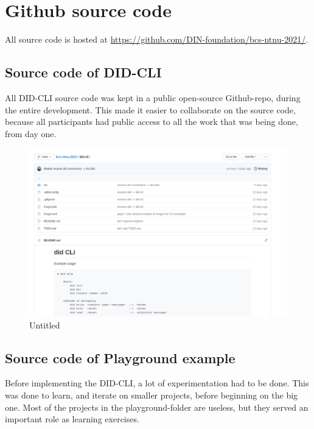 \pagebreak

\hypertarget{github-source-code}{%
\section{Github source code}\label{github-source-code}}

All source code is hosted at
\url{https://github.com/DIN-foundation/bcs-ntnu-2021/}.

\hypertarget{source-code-of-did-cli}{%
\subsection{Source code of DID-CLI}\label{source-code-of-did-cli}}

All DID-CLI source code was kept in a public open-source Github-repo,
during the entire development. This made it easier to collaborate on the
source code, because all participants had public access to all the work
that was being done, from day one.

\begin{figure}
\centering
\includegraphics{Development Process a132dd5987b94adf8fc5989add9afc3f/Untitled 1.png}
\caption{Untitled}
\end{figure}

\hypertarget{source-code-of-playground-example}{%
\subsection{Source code of Playground
example}\label{source-code-of-playground-example}}

Before implementing the DID-CLI, a lot of experimentation had to be
done. This was done to learn, and iterate on smaller projects, before
beginning on the big one. Most of the projects in the playground-folder
are useless, but they served an important role as learning exercises.

